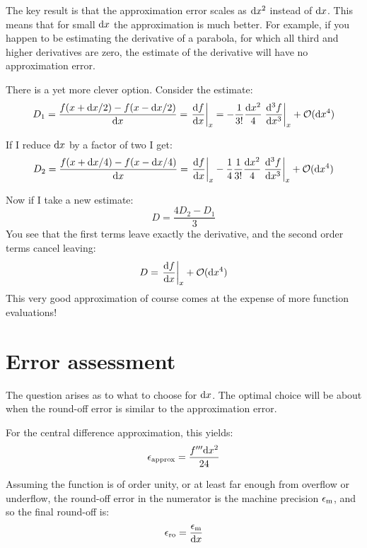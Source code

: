 The key result is that the approximation error scales as ${\rm d}x^2$
instead of ${\rm d}x$. This means that for small ${\rm d}x$ the
approximation is much better. For example, if you happen to be
estimating the derivative of a parabola, for which all third and
higher derivatives are zero, the estimate of the derivative will have
no approximation error.

There is a yet more clever option. Consider the estimate:
\begin{equation}
  D_1 = \frac{f(x + {\rm d}x / 2) - f(x - {\rm d}x / 2)}{{\rm d}x} =
  \left.\frac{{\rm d}f}{{\rm d}x}\right|_{x}  = 
  - \frac{1}{3!} \frac{{\rm d}x^2}{4} \left.\frac{{\rm d}^3f}{{\rm d}x^3}\right|_{x} 
  + \mathcal{O}({\rm d}x^4)
\end{equation}

If I reduce ${\rm d}x$ by a factor of two I get:
\begin{equation}
D_2 = \frac{f(x + {\rm d}x / 4) - f(x - {\rm d}x / 4)}{{\rm d}x} =
  \left.\frac{{\rm d}f}{{\rm d}x}\right|_{x}  
  - \frac{1}{4} \frac{1}{3!} \frac{{\rm d}x^2}{4} \left.\frac{{\rm d}^3f}{{\rm d}x^3}\right|_{x} 
  + \mathcal{O}({\rm d}x^4)
\end{equation}

Now if I take a new estimate:
\begin{equation}
D = \frac{4 D_2  - D_1}{3}
\end{equation}
You see that the first terms leave exactly the derivative, and the
second order terms cancel leaving:
\begin{equation}
D = \left.\frac{{\rm d}f}{{\rm d}x}\right|_{x}  + \mathcal{O}({\rm
  d}x^4)
\end{equation}
This very good approximation of course comes at the expense of more
function evaluations!

\section{Error assessment}

The question arises as to what to choose for ${\rm d}x$. The optimal
choice will be about when the round-off error is similar to the
approximation error. 

For the central difference approximation, this yields:
\begin{equation}
\epsilon_{\rm approx} = \frac{f''' {\rm d}x^2}{24}
\end{equation}

Assuming the function is of order unity, or at least far enough from
overflow or underflow, the round-off error in the numerator is the
machine precision $\epsilon_{\rm m}$, and so the final round-off is:
\begin{equation}
\epsilon_{\rm ro} = \frac{\epsilon_{\rm m}}{{\rm d}x}
\end{equation}

